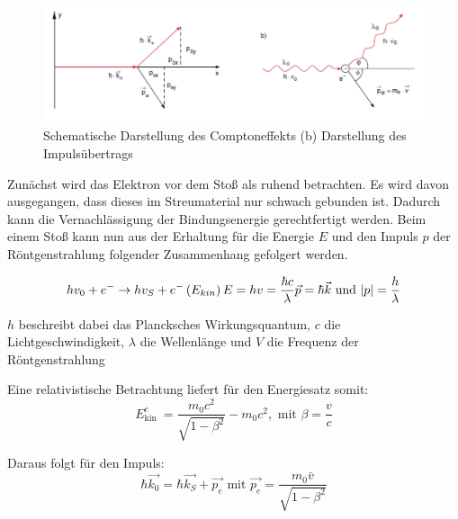 \documentclass[12pt,english,ngerman]{scrartcl}
\begin{document}
\begin{figure}[H]
	\begin{center}
		\includegraphics[width =\textwidth]{./figures/skizze_compton.PNG}
	\end{center}
	\caption[Darstellung des Comptoneffekts]
	{Schematische Darstellung des Comptoneffekts (b) Darstellung des Impulsübertrags
	\cite{unterlagen_compton}
	}\label{fig:skizze_compton}
\end{figure}


Zunächst wird das Elektron vor dem Stoß als ruhend betrachten.
Es wird davon ausgegangen, dass dieses im Streumaterial nur schwach gebunden ist.
Dadurch kann die Vernachlässigung der Bindungsenergie gerechtfertigt werden. Beim einem Stoß
kann nun aus der Erhaltung für die Energie $E$ und den Impuls $p$ der Röntgenstrahlung folgender Zusammenhang gefolgert werden.

\begin{equation}
	h v_0+e^{-} \rightarrow h v_S+e^{-}\left(E_{k i n}\right) \\
	E=h v=\frac{\hbar c}{\lambda}\\
	\vec{p}=\hbar \vec{k} \text { und }|p|=\frac{h}{\lambda}
	\label{eq:energie_impuls}
\end{equation}

$h$ beschreibt dabei das Plancksches Wirkungsquantum,
$c$ die Lichtgeschwindigkeit,
$\lambda$ die Wellenlänge und 
$V$ die Frequenz der Röntgenstrahlung

Eine relativistische Betrachtung liefert für den Energiesatz somit:
\begin{equation}
	E_{\text {kin }}^e=\frac{m_0 c^2}{\sqrt{1-\beta^2}}-m_0 c^2, \text { mit } \beta=\frac{v}{c}
\label{eq:energiesatz_relativistisch}
\end{equation}

Daraus folgt für den Impuls:
\begin{equation}
	\hbar \overrightarrow{k_0}=\hbar \overrightarrow{k_S}+\overrightarrow{p_e} \text { mit } \overrightarrow{p_e}=\frac{m_0 \bar{v}}{\sqrt{1-\beta^2}}
\label{eq:impuls_relativistisch}
\end{equation}
\end{document}
